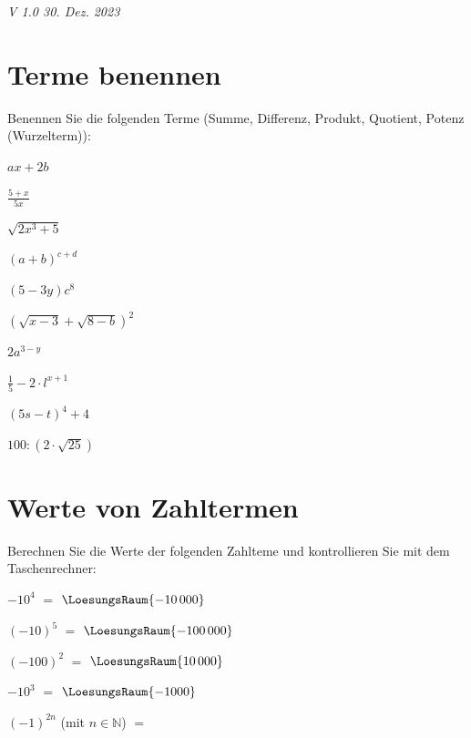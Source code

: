 
\renewcommand{\bbwAufgabenBlockID}{A1Te}

\renewcommand{\metaHeaderLine}{Aufgabenblatt}
\renewcommand{\arbeitsblattTitel}{Algebra: Terme}



\arbeitsblattHeader{}
\begin{center}\textit{\tiny{V 1.0 30. Dez. 2023}}\end{center}

\section{Terme benennen}
Benennen Sie die folgenden Terme (Summe, Differenz, Produkt, Quotient,
Potenz (Wurzelterm)):

\begin{bbwAufgabenBlock}
\item $ax+2b$ \, 
\item $\frac{5+x}{5x}$ \, 
\item $\sqrt{2x^3+5}$ \, 
\item $(a+b)^{c+d}$ \, 
\item $(5-3y)c^8$ \, 
\item $(\sqrt{x-3}+\sqrt{8-b})^2$ \, 
\item $2a^{3-y}$ \, \newpage
\item $\frac15 - 2\cdot{}l^{x+1}$ \, 
\item $(5s-t)^4+4$ \, 
\item $100:(2\cdot{}\sqrt{25})$ \, 
\end{bbwAufgabenBlock}

\newpage


\section{Werte von Zahltermen}
Berechnen Sie die Werte der folgenden Zahlteme und kontrollieren Sie
mit dem Taschenrechner:

\begin{bbwAufgabenBlock}
\item $-10^4$ $=$ $\LoesungsRaum{-10\,000}$
\item $(-10)^5$ $=$ $\LoesungsRaum{-100\,000}$
\item $(-100)^2$ $=$ $\LoesungsRaum{10\,000}$
\item $-10^3$ $=$ $\LoesungsRaum{-1000}$
\item $(-1)^{2n}$  (mit $n\in\mathbb{N}$)  $=$ 
\end{bbwAufgabenBlock}

